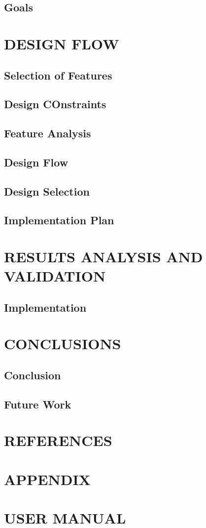 \documentclass[14pt]{extarticle}
\begin{document}
\subsection{Goals}

\newpage
\section{DESIGN FLOW}

\subsection{Selection of Features}
\subsection{Design COnstraints}
\subsection{Feature Analysis}
\subsection{Design Flow}
\subsection{Design Selection}
\subsection{Implementation Plan}


\newpage
\section{RESULTS ANALYSIS AND VALIDATION}

\subsection{Implementation}



\newpage
\section{CONCLUSIONS}

\subsection{Conclusion}
\subsection{Future Work}


\newpage
{}
\section*{REFERENCES}


\newpage
{}
\section*{APPENDIX}


\newpage
{}
\section*{USER MANUAL}
\end{document}
